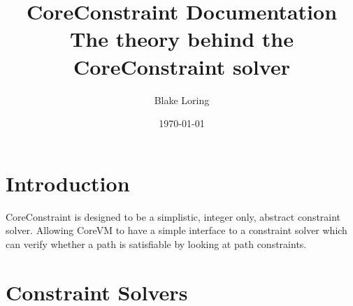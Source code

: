 \documentclass{report}
\begin{document}
\title{CoreConstraint Documentation \\ \large The theory behind the CoreConstraint solver}
\author{Blake Loring}
\date{\today}

\maketitle

\chapter {Introduction}

CoreConstraint is designed to be a simplistic, integer only, abstract constraint solver. Allowing CoreVM to have a simple interface to a constraint solver which can verify whether a path is satisfiable by looking at path constraints.

\chapter {Constraint Solvers}
\end{document}
